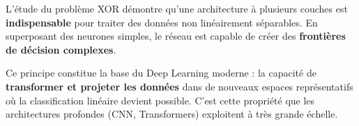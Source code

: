 \documentclass[12pt, a4paper]{article}
\begin{document}
L'étude du problème XOR démontre qu'une architecture à plusieurs couches est
\textbf{indispensable} pour traiter des données non linéairement séparables.
En superposant des neurones simples, le réseau est capable de créer des
\textbf{frontières de décision complexes}.

\begin{resultbox}
Ce principe constitue la base du Deep Learning moderne : la capacité de
\textbf{transformer et projeter les données} dans de nouveaux espaces représentatifs
où la classification linéaire devient possible. C'est cette propriété que les
architectures profondes (CNN, Transformers) exploitent à très grande échelle.
\end{resultbox}
\end{document}
